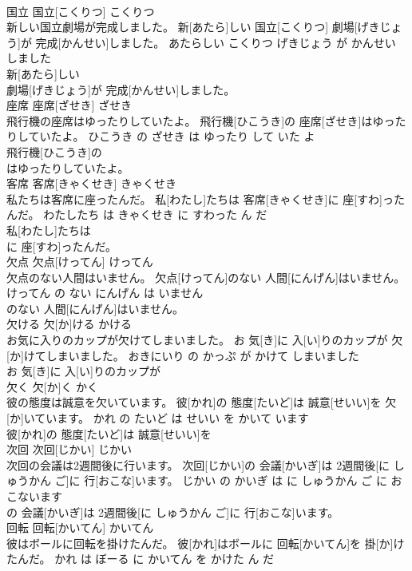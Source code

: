 \documentclass[8pt]{extreport}
\begin{document}
\begin{CJK}{UTF8}{min}
\\	国立	国立[こくりつ]	こくりつ	
\\	新しい国立劇場が完成しました。	新[あたら]しい 国立[こくりつ] 劇場[げきじょう]が 完成[かんせい]しました。	あたらしい こくりつ げきじょう が かんせい しました	
\\	新[あたら]しい
\\	劇場[げきじょう]が 完成[かんせい]しました。			
\\	座席	座席[ざせき]	ざせき	
\\	飛行機の座席はゆったりしていたよ。	飛行機[ひこうき]の 座席[ざせき]はゆったりしていたよ。	ひこうき の ざせき は ゆったり して いた よ	
\\	飛行機[ひこうき]の
\\	はゆったりしていたよ。			
\\	客席	客席[きゃくせき]	きゃくせき	
\\	私たちは客席に座ったんだ。	私[わたし]たちは 客席[きゃくせき]に 座[すわ]ったんだ。	わたしたち は きゃくせき に すわった ん だ	
\\	私[わたし]たちは
\\	に 座[すわ]ったんだ。			
\\	欠点	欠点[けってん]	けってん	
\\	欠点のない人間はいません。	欠点[けってん]のない 人間[にんげん]はいません。	けってん の ない にんげん は いません	
\\	のない 人間[にんげん]はいません。			
\\	欠ける	欠[か]ける	かける	
\\	お気に入りのカップが欠けてしまいました。	お 気[き]に 入[い]りのカップが 欠[か]けてしまいました。	おきにいり の かっぷ が かけて しまいました	
\\	お 気[き]に 入[い]りのカップが
\\	欠く	欠[か]く	かく	
\\	彼の態度は誠意を欠いています。	彼[かれ]の 態度[たいど]は 誠意[せいい]を 欠[か]いています。	かれ の たいど は せいい を かいて います	
\\	彼[かれ]の 態度[たいど]は 誠意[せいい]を
\\	次回	次回[じかい]	じかい	
\\	次回の会議は2週間後に行います。	次回[じかい]の 会議[かいぎ]は 2週間後[に しゅうかん ご]に 行[おこな]います。	じかい の かいぎ は に しゅうかん ご に おこないます	
\\	の 会議[かいぎ]は 2週間後[に しゅうかん ご]に 行[おこな]います。			
\\	回転	回転[かいてん]	かいてん	
\\	彼はボールに回転を掛けたんだ。	彼[かれ]はボールに 回転[かいてん]を 掛[か]けたんだ。	かれ は ぼーる に かいてん を かけた ん だ	

\end{CJK}
\end{document}
